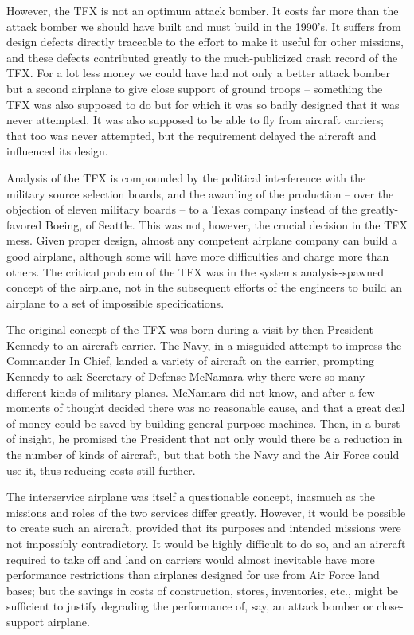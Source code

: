 However, the TFX is not an optimum attack bomber. It costs far more than the attack bomber we should have built and must build in the 1990's. It suffers from design defects directly traceable to the effort to make it useful for other missions, and these defects contributed greatly to the much-publicized crash record of the TFX. For a lot less money we could have had not only a better attack bomber but a second airplane to give close support of ground troops -- something the TFX was also supposed to do but for which it was so badly designed that it was never attempted. It was also supposed to be able to fly from aircraft carriers; that too was never attempted, but the requirement delayed the aircraft and influenced its design.

Analysis of the TFX is compounded by the political interference with the military source selection boards, and the awarding of the production -- over the objection of eleven military boards -- to a Texas company instead of the greatly-favored Boeing, of Seattle. This was not, however, the crucial decision in the TFX mess. Given proper design, almost any competent airplane company can build a good airplane, although some will have more difficulties and charge more than others. The critical problem of the TFX was in the systems analysis-spawned concept of the airplane, not in the subsequent efforts of the engineers to build an airplane to a set of impossible specifications.

The original concept of the TFX was born during a visit by then President Kennedy to an aircraft carrier. The Navy, in a misguided attempt to impress the Commander In Chief, landed a variety of aircraft on the carrier, prompting Kennedy to ask Secretary of Defense McNamara why there were so many different kinds of military planes. McNamara did not know, and after a few moments of thought decided there was no reasonable cause, and that a great deal of money could be saved by building general purpose machines. Then, in a burst of insight, he promised the President that not only would there be a reduction in the number of kinds of aircraft, but that both the Navy and the Air Force could use it, thus reducing costs still further.

The interservice airplane was itself a questionable concept, inasmuch as the missions and roles of the two services differ greatly. However, it would be possible to create such an aircraft, provided that its purposes and intended missions were not impossibly contradictory. It would be highly difficult to do so, and an aircraft required to take off and land on carriers would almost inevitable have more performance restrictions than airplanes designed for use from Air Force land bases; but the savings in costs of construction, stores, inventories, etc., might be sufficient to justify degrading the performance of, say, an attack bomber or close-support airplane.

